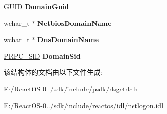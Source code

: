 \begin{DoxyCompactItemize}
\item 
\mbox{\label{struct___d_s___d_o_m_a_i_n___t_r_u_s_t_s_w_aeb7f78d529b1b473ee6ef4bce16bb97c}} 
\hyperlink{interface_g_u_i_d}{G\+U\+ID} {\bfseries Domain\+Guid}
\item 
\mbox{\label{struct___d_s___d_o_m_a_i_n___t_r_u_s_t_s_w_a39dccbb0eb918dc262fa79ce41d94175}} 
wchar\+\_\+t $\ast$ {\bfseries Netbios\+Domain\+Name}
\item 
\mbox{\label{struct___d_s___d_o_m_a_i_n___t_r_u_s_t_s_w_a6a616484a55eaeb905a8f14b1986a1fb}} 
wchar\+\_\+t $\ast$ {\bfseries Dns\+Domain\+Name}
\item 
\mbox{\label{struct___d_s___d_o_m_a_i_n___t_r_u_s_t_s_w_ad6411202e1a05b92d6792cf763b532e5}} 
\hyperlink{struct___r_p_c___s_i_d}{P\+R\+P\+C\+\_\+\+S\+ID} {\bfseries Domain\+Sid}
\end{DoxyCompactItemize}


该结构体的文档由以下文件生成\+:\begin{DoxyCompactItemize}
\item 
E\+:/\+React\+O\+S-\/0../sdk/include/psdk/dsgetdc.\+h\item 
E\+:/\+React\+O\+S-\/0../sdk/include/reactos/idl/netlogon.\+idl\end{DoxyCompactItemize}
